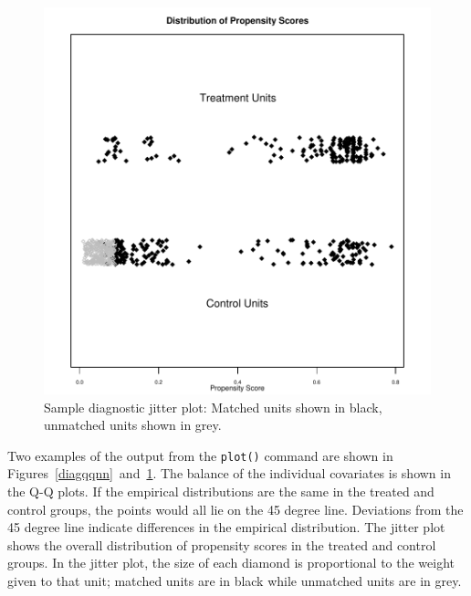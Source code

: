 \begin{figure}[tbp]
  \begin{center}
    \includegraphics[scale=0.5]{figs/jitterplotnn}
    \hfill
    \caption{Sample diagnostic jitter plot: Matched units shown in
      black, unmatched units shown in grey.}
    \label{diagjitternn}
  \end{center}
\end{figure}

Two examples of the output from the {\tt plot()} command are shown in
Figures~\ref{diagqqnn}~and~\ref{diagjitternn}. The balance of the
individual covariates is shown in the Q-Q plots.  If the empirical
distributions are the same in the treated and control groups, the
points would all lie on the 45 degree line.  Deviations from the 45
degree line indicate differences in the empirical distribution.  The
jitter plot shows the overall distribution of propensity scores in the
treated and control groups.  In the jitter plot, the size of each
diamond is proportional to the weight given to that unit; matched
units are in black while unmatched units are in grey.  

